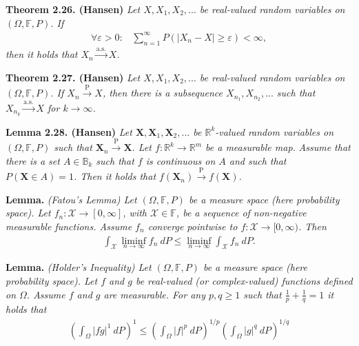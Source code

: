 \documentclass[
]{book}
\begin{document}
\textbf{Theorem 2.26. (Hansen)} \emph{Let \(X,X_1,X_2,...\) be real-valued random variables on \((\Omega,\mathbb{F},P)\). If}
\begin{align*}
    \forall \varepsilon>0:\hspace{10pt}\sum_{n=1}^\infty P(\vert X_n-X\vert \ge \varepsilon)<\infty,\tag{2.32}
\end{align*}
\emph{then it holds that \(X_n\stackrel{\text{a.s.}}{\to} X\).}

\textbf{Theorem 2.27. (Hansen)} \emph{Let \(X,X_1,X_2,...\) be real-valued random variables on \((\Omega,\mathbb{F},P)\). If \(X_n\stackrel{\text{P}}{\to} X\), then there is a subsequence \(X_{n_1},X_{n_2},...\) such that \(X_{n_k}\stackrel{\text{a.s.}}{\to} X\) for \(k\to \infty\).}

\textbf{Lemma 2.28. (Hansen)} \emph{Let \(\mathbf{X},\mathbf{X}_1,\mathbf{X}_2,...\) be \(\mathbb{R}^k\)-valued random variables on \((\Omega,\mathbb{F},P)\) such that \(\mathbf{X}_n\stackrel{\text{P}}{\to} \mathbf{X}\). Let \(f : \mathbb{R}^k\to \mathbb{R}^m\) be a measurable map.}
\emph{Assume that there is a set \(A\in\mathbb{B}_k\) such that \(f\) is continuous on \(A\) and such that \(P(\mathbf{X}\in A)=1\). Then it holds that \(f(\mathbf{X}_n)\stackrel{\text{P}}{\to} f(\mathbf{X})\).}

\textbf{Lemma.} \emph{(Fatou's Lemma) Let \((\Omega,\mathbb{F},P)\) be a measure space (here probability space). Let \(f_n : \mathcal{X} \to [0,\infty]\), with \(\mathcal{X}\in\mathbb{F}\), be a sequence of non-negative measurable functions. Assume \(f_n\) converge pointwise to \(f : \mathcal{X}\to [0,\infty)\). Then}
\begin{align*}
    \int_{\mathcal{X}} \liminf_{n\to\infty} f_n\ dP\le \liminf_{n\to\infty} \int_{\mathcal{X}} f_n\ dP.
\end{align*}

\textbf{Lemma.} \emph{(Holder's Inequality)  Let \((\Omega,\mathbb{F},P)\) be a measure space (here probability space). Let \(f\) and \(g\) be real-valued (or complex-valued) functions defined on \(\Omega\). Assume \(f\) and \(g\) are measurable. For any \(p,q\ge 1\) such that \(\frac{1}{p}+\frac{1}{q}=1\) it holds that }
\begin{align*}
    \left(\int_\Omega \vert fg\vert^1\ dP\right)^1\le \left(\int_\Omega \vert f\vert^p\ dP\right)^{1/p}\left(\int_\Omega \vert g\vert^q\ dP\right)^{1/q}
\end{align*}
\end{document}
